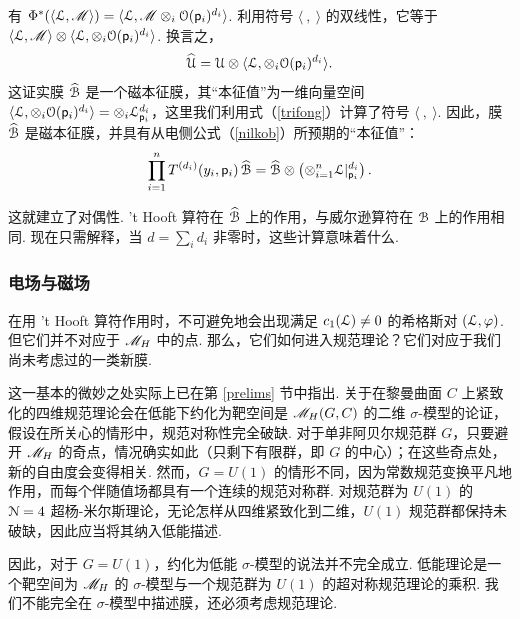 有 $\Phi^*(\langle\L,\M\rangle)=\langle\L,\M\otimes_i \O(\pp_i)^{d_i}\rangle$. 利用符号 $\langle~,~\rangle$ 的双线性，它等于 $\langle\L,\M\rangle\otimes \langle\L,\otimes_i\O(\pp_i)^{d_i}\rangle$. 换言之，
\begin{equation}\label{menz}\hat\U=\U\otimes\langle\L,\otimes _i\O(\pp_i)^{d_i}\rangle. \end{equation}
这证实膜 $\hat \B$ 是一个磁本征膜，其“本征值”为一维向量空间 $\langle\L,\otimes _i\O(\pp_i)^{d_i}\rangle=\otimes_i \L_{\pp_i}^{d_i}$，这里我们利用式（\ref{trifong}）计算了符号 $\langle~,~\rangle$. 因此，膜 $\hat {\cal B}$ 是磁本征膜，并具有从电侧公式（\ref{nilkob}）所预期的“本征值”：
\begin{equation}\label{rgo}
{\prod_{i=1}^n} \,T^{(d_i)}(y_i,\pp_i)\,\hat{\cal B}=\hat{\cal B}\otimes
\left(\otimes_{i=1}^n{\cal L}|_{\pp_i}^{d_i}\right).
\end{equation}

这就建立了对偶性. 't Hooft 算符在 $\hat{\cal B}$ 上的作用，与威尔逊算符在 ${\cal B}$ 上的作用相同. 现在只需解释，当 $d=\sum_id_i$ 非零时，这些计算意味着什么.

\subsubsection{电场与磁场}
\label{elmag}

在用 't Hooft 算符作用时，不可避免地会出现满足 $c_1({\cal L})\not= 0$ 的希格斯对 $({\cal L},\varphi)$. 但它们并不对应于 $\MH$ 中的点. 那么，它们如何进入规范理论？它们对应于我们尚未考虑过的一类新膜.

这一基本的微妙之处实际上已在第 \ref{prelims} 节中指出. 关于在黎曼曲面 $C$ 上紧致化的四维规范理论会在低能下约化为靶空间是 $\MH(G,C)$ 的二维 $\sigma$-模型的论证，假设在所关心的情形中，规范对称性完全破缺. 对于单非阿贝尔规范群 $G$，只要避开 $\MH$ 的奇点，情况确实如此（只剩下有限群，即 $G$ 的中心）；在这些奇点处，新的自由度会变得相关. 然而，$G=U(1)$ 的情形不同，因为常数规范变换平凡地作用，而每个伴随值场都具有一个连续的规范对称群. 对规范群为 $U(1)$ 的 $\N=4$ 超杨-米尔斯理论，无论怎样从四维紧致化到二维，$U(1)$ 规范群都保持未破缺，因此应当将其纳入低能描述.

因此，对于 $G=U(1)$，约化为低能 $\sigma$-模型的说法并不完全成立. 低能理论是一个靶空间为 $\MH$ 的 $\sigma$-模型与一个规范群为 $U(1)$ 的超对称规范理论的乘积. 我们不能完全在 $\sigma$-模型中描述膜，还必须考虑规范理论.

